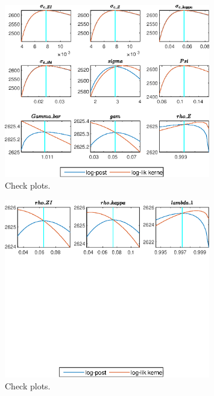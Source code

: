  
\begin{figure}[H]
\centering 
\includegraphics[width=0.80\textwidth]{directed_search_simp/graphs/directed_search_simp_CheckPlots1}
\caption{Check plots.}\label{Fig:CheckPlots:1}
\end{figure}
 
\begin{figure}[H]
\centering 
\includegraphics[width=0.80\textwidth]{directed_search_simp/graphs/directed_search_simp_CheckPlots2}
\caption{Check plots.}\label{Fig:CheckPlots:2}
\end{figure}
 
